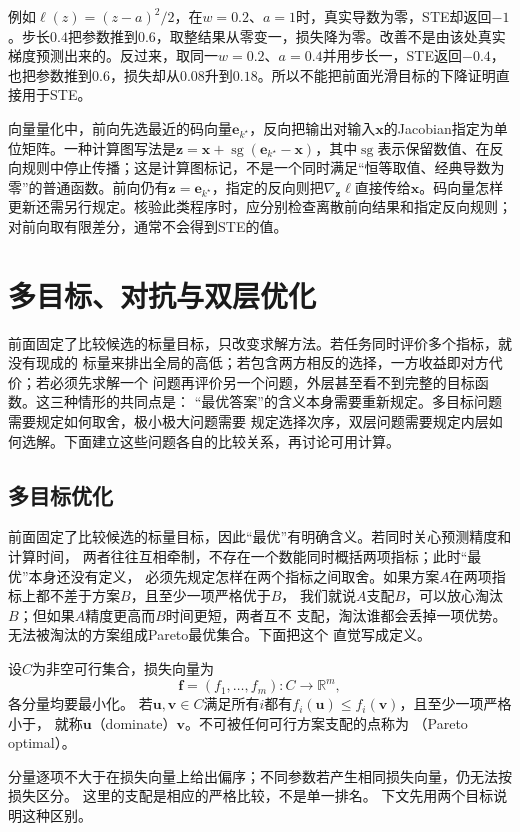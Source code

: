 例如$\ell(z)=(z-a)^2/2$，在$w=0.2$、$a=1$时，真实导数为零，STE却返回$-1$。步长$0.4$把参数推到$0.6$，取整结果从零变一，损失降为零。改善不是由该处真实梯度预测出来的。反过来，取同一$w=0.2$、$a=0.4$并用步长一，STE返回$-0.4$，也把参数推到$0.6$，损失却从$0.08$升到$0.18$。所以不能把前面光滑目标的下降证明直接用于STE。

向量量化中，前向先选最近的码向量$\bm e_{k^\star}$，反向把输出对输入$\bm x$的Jacobian指定为单位矩阵。一种计算图写法是$\bm z=\bm x+\operatorname{sg}(\bm e_{k^\star}-\bm x)$，其中$\operatorname{sg}$表示保留数值、在反向规则中停止传播；这是计算图标记，不是一个同时满足“恒等取值、经典导数为零”的普通函数。前向仍有$\bm z=\bm e_{k^\star}$，指定的反向则把$\nabla_{\bm z}\ell$直接传给$\bm x$。码向量怎样更新还需另行规定。核验此类程序时，应分别检查离散前向结果和指定反向规则；对前向取有限差分，通常不会得到STE的值。


\section{多目标、对抗与双层优化}
\label{sec:opt-decomposition-multiple-levels}

前面固定了比较候选的标量目标，只改变求解方法。若任务同时评价多个指标，就没有现成的
标量来排出全局的高低；若包含两方相反的选择，一方收益即对方代价；若必须先求解一个
问题再评价另一个问题，外层甚至看不到完整的目标函数。这三种情形的共同点是：
“最优答案”的含义本身需要重新规定。多目标问题需要规定如何取舍，极小极大问题需要
规定选择次序，双层问题需要规定内层如何选解。下面建立这些问题各自的比较关系，再讨论可用计算。

\subsection{多目标优化}
\label{sec:opt-multiobjective-saddle}

前面固定了比较候选的标量目标，因此“最优”有明确含义。若同时关心预测精度和计算时间，
两者往往互相牵制，不存在一个数能同时概括两项指标；此时“最优”本身还没有定义，
必须先规定怎样在两个指标之间取舍。如果方案$A$在两项指标上都不差于方案$B$，且至少一项严格优于$B$，
我们就说$A$支配$B$，可以放心淘汰$B$；但如果$A$精度更高而$B$时间更短，两者互不
支配，淘汰谁都会丢掉一项优势。无法被淘汰的方案组成Pareto最优集合。下面把这个
直觉写成定义。
\begin{definition}[支配与Pareto最优]
\label{def:opt-pareto-optimality}
设$C$为非空可行集合，损失向量为
\[
 \bm f=(f_1,\ldots,f_m):C\to\mathbb R^m,
\]
各分量均要最小化。
若$\bm u,\bm v\in C$满足所有$i$都有$f_i(\bm u)\leq f_i(\bm v)$，且至少一项严格小于，
就称$\bm u$（dominate）$\bm v$。不可被任何可行方案支配的点称为
（Pareto optimal）。
\end{definition}
分量逐项不大于在损失向量上给出偏序；不同参数若产生相同损失向量，仍无法按损失区分。
这里的支配是相应的严格比较，不是单一排名。
下文先用两个目标说明这种区别。

